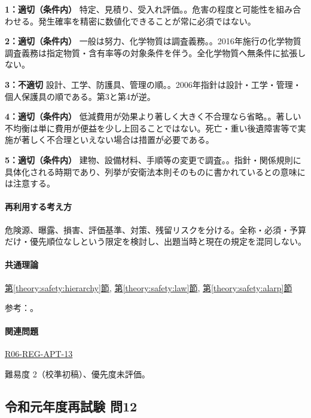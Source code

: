 \noindent\textbf{1：適切（条件内）} 特定、見積り、受入れ評価。。危害の程度と可能性を組み合わせる。発生確率を精密に数値化できることが常に必須ではない。\par

\noindent\textbf{2：適切（条件内）} 一般は努力、化学物質は調査義務。。2016年施行の化学物質調査義務は指定物質・含有率等の対象条件を伴う。全化学物質へ無条件に拡張しない。\par

\noindent\textbf{3：不適切} 設計、工学、防護具、管理の順。。2006年指針は設計・工学・管理・個人保護具の順である。第3と第4が逆。\par

\noindent\textbf{4：適切（条件内）} 低減費用が効果より著しく大きく不合理なら省略。。著しい不均衡は単に費用が便益を少し上回ることではない。死亡・重い後遺障害等で実施が著しく不合理といえない場合は措置が必要である。\par

\noindent\textbf{5：適切（条件内）} 建物、設備材料、手順等の変更で調査。。指針・関係規則に具体化される時期であり、列挙が安衛法本則そのものに書かれているとの意味には注意する。\par

\paragraph{再利用する考え方} 危険源、曝露、損害、評価基準、対策、残留リスクを分ける。全称・必須・予算だけ・優先順位なしという限定を検討し、出題当時と現在の規定を混同しない。

\paragraph{共通理論} \hyperref[theory:safety:hierarchy]{第\ref*{theory:safety:hierarchy}節}, \hyperref[theory:safety:law]{第\ref*{theory:safety:law}節}, \hyperref[theory:safety:alarp]{第\ref*{theory:safety:alarp}節}

\par 参考：\cite{saf_ra2006,saf_chem2016,saf_chemqa}。

\paragraph{関連問題} \hyperref[q:r06-reg-apt-13]{R06-REG-APT-13}

\par 難易度 2（校準初稿）、優先度未評価。

\subsection{令和元年度再試験 問12}
\label{q:r01-ret-apt-12}

